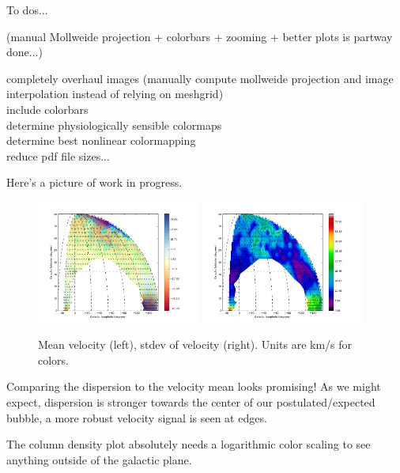 \documentclass[10pt]{article}
\begin{document}
To dos...

(manual Mollweide projection + colorbars + zooming + better plots is partway done...)

completely overhaul images (manually compute mollweide projection and image\\ interpolation instead of relying on meshgrid)\\
include colorbars\\
determine physiologically sensible colormaps\\
determine best nonlinear colormapping\\
reduce pdf file sizes...

Here's a picture of work in progress.

\begin{figure}[!ht]
    \centering
    \includegraphics[width=0.48\textwidth]{v_ave_temporary.png}
    \includegraphics[width=0.48\textwidth]{v_std_temporary.png} \\
    \caption{Mean velocity (left), stdev of velocity (right).  Units are km/s for colors.}
    \label{fig:velocs_again}
\end{figure}

Comparing the dispersion to the velocity mean looks promising!  As we might expect, dispersion is stronger towards the center of our postulated/expected bubble, a more robust velocity signal is seen at edges.

The column density plot absolutely needs a logarithmic color scaling to see anything outside of the galactic plane.
\end{document}
